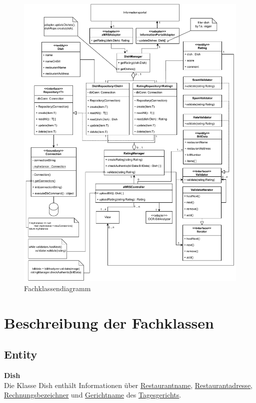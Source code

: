 \begin{figure}[H]
    \centering
    \caption{Fachklassendiagramm} \label{fig:Fachklassendiagramm}
    \includegraphics[width=\textwidth,keepaspectratio]{images/Fachklassenmodell}
\end{figure}

\section*{Beschreibung der Fachklassen}

\subsection*{Entity}
\textbf{Dish} \\
Die Klasse Dish enthält Informationen über \hyperref[gls:restaurantname]{Restaurantname}, \hyperref[gls:restaurantAdresse]{Restaurantadresse}, \hyperref[gls:Rechnungsbezeichner]{Rechnungsbezeichner} und \hyperref[gls:gerichtname]{Gerichtname} des
\hyperref[gls:tagesgericht]{Tagesgerichts}.
\newline

